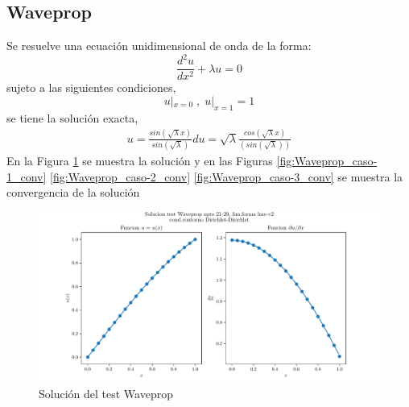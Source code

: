 
\subsection{Waveprop}
Se resuelve una ecuación unidimensional de onda de la forma:
\begin{equation}
    \frac{d^2u}{dx^2} + \lambda u = 0
\end{equation}
sujeto a las siguientes condiciones,
\begin{equation}
    u|_{x=0} \; , \; u|_{x=1} = 1
\end{equation}
se tiene la solución exacta,
\begin{eqnarray}
    u = \frac{ sin( \sqrt{\lambda} x) }{ sin( \sqrt{\lambda} ) }
    du = \sqrt{\lambda} \frac{ cos( \sqrt{\lambda} x )} {( sin( \sqrt{\lambda} ))}
\end{eqnarray}
En la Figura \ref{fig:Waveprop_caso-1_sol} se muestra la solución y en las Figuras \ref{fig:Waveprop_caso-1_conv} \ref{fig:Waveprop_caso-2_conv} \ref{fig:Waveprop_caso-3_conv} se muestra la convergencia de la solución
\begin{figure}
    \centering
    \includegraphics[width=1\textwidth]{./Imagenes/06/solucion/Waveprop_21-20_regular_type-2_caso-1_lme-v2_direct_dgesv-lapack-blas.pdf}
    \caption{Solución del test Waveprop} \label{fig:Waveprop_caso-1_sol}
\end{figure}
